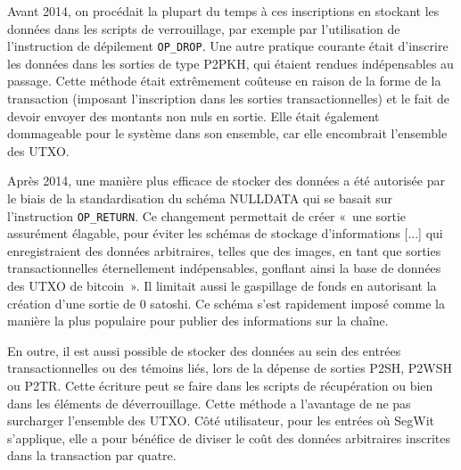 Avant 2014, on procédait la plupart du temps à ces inscriptions en stockant les données dans les scripts de verrouillage, par exemple par l'utilisation de l'instruction de dépilement \texttt{OP\_DROP}. Une autre pratique courante était d'inscrire les données dans les sorties de type P2PKH, qui étaient rendues indépensables au passage. Cette méthode était extrêmement coûteuse en raison de la forme de la transaction (imposant l'inscription dans les sorties transactionnelles) et le fait de devoir envoyer des montants non nuls en sortie. Elle était également dommageable pour le système dans son ensemble, car elle encombrait l'ensemble des UTXO.

Après 2014, une manière plus efficace de stocker des données a été autorisée par le biais de la standardisation du schéma NULLDATA qui se basait sur l'instruction \texttt{OP\_RETURN}. Ce changement permettait de créer «~une sortie assurément élagable, pour éviter les schémas de stockage d'informations [...] qui enregistraient des données arbitraires, telles que des images, en tant que sorties transactionnelles éternellement indépensables, gonflant ainsi la base de données des UTXO de bitcoin~». Il limitait aussi le gaspillage de fonds en autorisant la création d'une sortie de 0 satoshi. Ce schéma s'est rapidement imposé comme la manière la plus populaire pour publier des informations sur la chaîne. %

En outre, il est aussi possible de stocker des données au sein des entrées transactionnelles ou des témoins liés, lors de la dépense de sorties P2SH, P2WSH ou P2TR. Cette écriture peut se faire dans les scripts de récupération ou bien dans les éléments de déverrouillage. Cette méthode a l'avantage de ne pas surcharger l'ensemble des UTXO. Côté utilisateur, pour les entrées où SegWit s'applique, elle a pour bénéfice de diviser le coût des données arbitraires inscrites dans la transaction par quatre.

